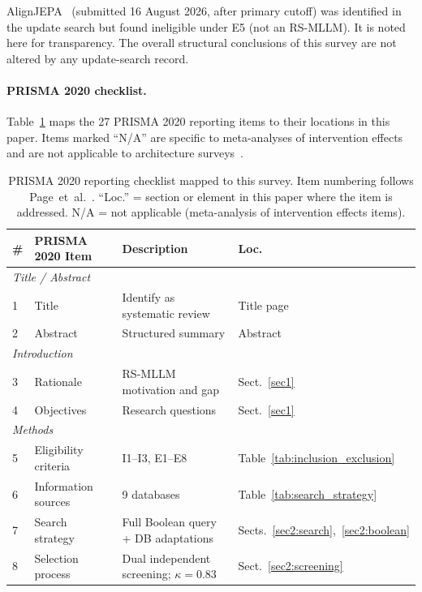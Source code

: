\noindent AlignJEPA~\cite{alignjepa_2026} (submitted 16 August 2026, after primary
cutoff) was identified in the update search but found ineligible under E5
(not an RS-MLLM). It is noted here for transparency.
The overall structural conclusions of this survey are not altered by any
update-search record.

\paragraph{PRISMA 2020 checklist.}
Table~\ref{tab:prisma_checklist} maps the 27 PRISMA 2020 reporting items to
their locations in this paper. Items marked ``N/A'' are specific to
meta-analyses of intervention effects and are not applicable to architecture
surveys~\cite{page2021prisma}.

\begin{table}[h]
\caption{PRISMA 2020 reporting checklist mapped to this survey.
Item numbering follows Page~et~al.~\cite{page2021prisma}.
``Loc.'' = section or element in this paper where the item is addressed.
N/A = not applicable (meta-analysis of intervention effects items).
}\label{tab:prisma_checklist}
\tiny\setlength\tabcolsep{3pt}
\begin{tabular*}{\textwidth}{@{\extracolsep\fill}p{0.5cm}p{3.2cm}p{6.0cm}p{2.0cm}}
\toprule
\textbf{\#} & \textbf{PRISMA 2020 Item} & \textbf{Description} & \textbf{Loc.} \\
\midrule
\multicolumn{4}{l}{\textit{Title / Abstract}} \\
1  & Title & Identify as systematic review & Title page \\
2  & Abstract & Structured summary & Abstract \\
\midrule
\multicolumn{4}{l}{\textit{Introduction}} \\
3  & Rationale & RS-MLLM motivation and gap & Sect.~\ref{sec1} \\
4  & Objectives & Research questions & Sect.~\ref{sec1} \\
\midrule
\multicolumn{4}{l}{\textit{Methods}} \\
5  & Eligibility criteria & I1--I3, E1--E8 & Table~\ref{tab:inclusion_exclusion} \\
6  & Information sources & 9 databases & Table~\ref{tab:search_strategy} \\
7  & Search strategy & Full Boolean query + DB adaptations & Sects.~\ref{sec2:search},~\ref{sec2:boolean} \\
8  & Selection process & Dual independent screening; $\kappa=0.83$ & Sect.~\ref{sec2:screening} \\

\end{tabular*}
\end{table}
